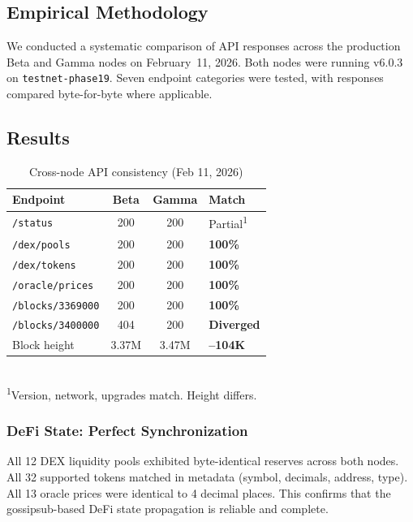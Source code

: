 \documentclass[11pt,a4paper,twocolumn]{article}
\begin{document}
\subsection{Empirical Methodology}

We conducted a systematic comparison of API responses across the production
Beta and Gamma nodes on February~11, 2026. Both nodes were running v6.0.3
on \texttt{testnet-phase19}. Seven endpoint categories were tested, with responses
compared byte-for-byte where applicable.

\subsection{Results}

\begin{table}[H]
\centering
\caption{Cross-node API consistency (Feb 11, 2026)}
\label{tab:syncresults}
\scriptsize
\begin{tabularx}{\columnwidth}{lccX}
\toprule
\textbf{Endpoint} & \textbf{Beta} & \textbf{Gamma} & \textbf{Match} \\
\midrule
\texttt{/status}           & 200 & 200 & Partial\textsuperscript{1} \\
\texttt{/dex/pools}        & 200 & 200 & \textcolor{qnkgreen}{\textbf{100\%}} \\
\texttt{/dex/tokens}       & 200 & 200 & \textcolor{qnkgreen}{\textbf{100\%}} \\
\texttt{/oracle/prices}    & 200 & 200 & \textcolor{qnkgreen}{\textbf{100\%}} \\
\texttt{/blocks/3369000}   & 200 & 200 & \textcolor{qnkgreen}{\textbf{100\%}} \\
\texttt{/blocks/3400000}   & 404 & 200 & \textcolor{qnkred}{\textbf{Diverged}} \\
Block height               & 3.37M & 3.47M & \textcolor{qnkred}{\textbf{--104K}} \\
\bottomrule
\end{tabularx}
\\[4pt]
\scriptsize\textsuperscript{1}Version, network, upgrades match. Height differs.
\end{table}

\subsubsection{DeFi State: Perfect Synchronization}

All 12 DEX liquidity pools exhibited byte-identical reserves across both nodes.
All 32 supported tokens matched in metadata (symbol, decimals, address, type).
All 13 oracle prices were identical to 4 decimal places. This confirms that
the gossipsub-based DeFi state propagation is reliable and complete.
\end{document}
